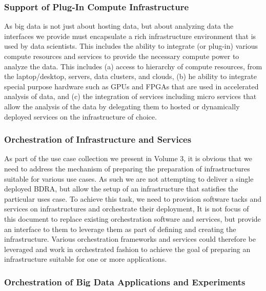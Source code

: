 \documentclass[10pt]{article}
\begin{document}
\subsubsection{Support of Plug-In Compute Infrastructure}

As big data is not just about hosting data, but about analyzing data
the interfaces we provide must encapsulate a rich infrastructure
environment that is used by data scientists. This includes the ability
to integrate (or plug-in) various compute resources and services to
provide the necessary compute power to analyze the data. This includes
(a) access to hierarchy of compute resources, from the laptop/desktop,
servers, data clusters, and clouds, (b) he ability to integrate
special purpose hardware such as GPUs and FPGAs that are used in
accelerated analysis of data, and (c) the integration of services
including micro services that allow the analysis of the data by
delegating them to hosted or dynamically deployed services on the
infrastructure of choice.

\subsubsection{Orchestration of Infrastructure and Services}

As part of the use case collection we present in Volume 3, it is
obvious that we need to address the mechanism of preparing the
preparation of infrastructures suitable for various use cases. As such
we are not attempting to deliver a single deployed BDRA, but allow the
setup of an infrastructure that satisfies the particular uses case. To
achieve this task, we need to provision software tacks and services on
infrastructures and orchestrate their deployment, It is not focus of
this document to replace existing orchestration software and services,
but provide an interface to them to leverage them as part of defining
and creating the infrastructure. Various orchestration frameworks and
services could therefore be leveraged and work in orchestrated fashion
to achieve the goal of preparing an infrastructure suitable for one or
more applications.

\subsubsection{Orchestration of Big Data Applications and Experiments}
\end{document}
